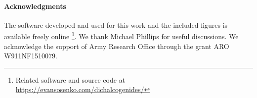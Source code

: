 \paragraph{Acknowledgments}

The software developed and used for this work
and the included figures is available freely online
\footnote{%
  Related software and source code at \\
  \url{https://evansosenko.com/dichalcogenides/}
}.
We thank Michael Phillips for useful discussions.
We acknowledge the support of Army Research Office through the grant
ARO W911NF1510079.
